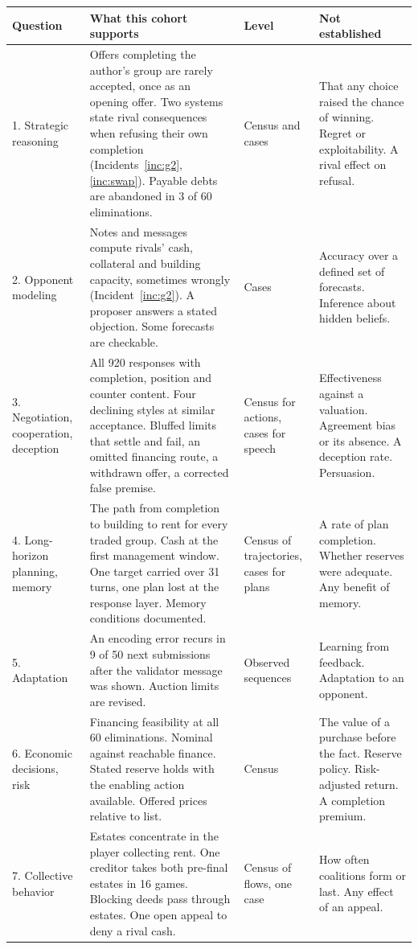 \begin{table}[p]
\centering\footnotesize
\renewcommand{\arraystretch}{1.12}
\begin{tabularx}{\linewidth}{@{}L{2.5cm}YL{1.7cm}L{3.6cm}@{}}
\toprule
Question & What this cohort supports & Level & Not established\\
. Strategic reasoning & Offers completing the author's group are rarely accepted, once as an opening offer. Two systems state rival consequences when refusing their own completion (Incidents~\ref{inc:g2}, \ref{inc:swap}). Payable debts are abandoned in 3 of 60 eliminations. & Census and cases & That any choice raised the chance of winning. Regret or exploitability. A rival effect on refusal.\\
2. Opponent modeling & Notes and messages compute rivals' cash, collateral and building capacity, sometimes wrongly (Incident~\ref{inc:g2}). A proposer answers a stated objection. Some forecasts are checkable. & Cases & Accuracy over a defined set of forecasts. Inference about hidden beliefs.\\
3. Negotiation, cooperation, deception & All 920 responses with completion, position and counter content. Four declining styles at similar acceptance. Bluffed limits that settle and fail, an omitted financing route, a withdrawn offer, a corrected false premise. & Census for actions, cases for speech & Effectiveness against a valuation. Agreement bias or its absence. A deception rate. Persuasion.\\
4. Long-horizon planning, memory & The path from completion to building to rent for every traded group. Cash at the first management window. One target carried over 31 turns, one plan lost at the response layer. Memory conditions documented. & Census of trajectories, cases for plans & A rate of plan completion. Whether reserves were adequate. Any benefit of memory.\\
5. Adaptation & An encoding error recurs in 9 of 50 next submissions after the validator message was shown. Auction limits are revised. & Observed sequences & Learning from feedback. Adaptation to an opponent.\\
6. Economic decisions, risk & Financing feasibility at all 60 eliminations. Nominal against reachable finance. Stated reserve holds with the enabling action available. Offered prices relative to list. & Census & The value of a purchase before the fact. Reserve policy. Risk-adjusted return. A completion premium.\\
7. Collective behavior & Estates concentrate in the player collecting rent. One creditor takes both pre-final estates in 16 games. Blocking deeds pass through estates. One open appeal to deny a rival cash. & Census of flows, one case & How often coalitions form or last. Any effect of an appeal.\\

\end{tabularx}
\end{table}
